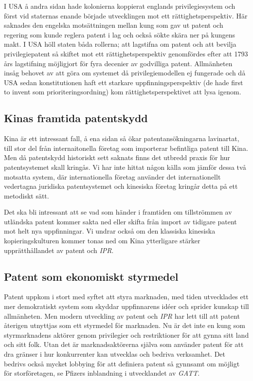 I USA å andra sidan hade kolonierna koppierat englands privilegiesystem och först vid staternas enande började utvecklingen mot ett rättighetsperspektiv. Här saknades den engelska motsättningen mellan kung som gav ut patent och regering som kunde reglera patent i lag och också sökte skära ner på kungens makt. I USA höll staten båda rollerna; att lagstifna om patent och att bevilja privilegiepatent så skiftet mot ett rättighetsperspektiv genomfördes efter att 1793 års lagstifning möjligjort för fyra decenier av godvilliga patent. Allmänheten insåg behovet av att göra om systemet då privilegiemodellen ej fungerade och då USA sedan konstitutionen haft ett starkare uppfinningsperspektiv (de hade first to invent som prioriteringsordning) kom rättighetsperspektivet att lysa igenom.


\subsection{Kinas framtida patentskydd}

Kina är ett intressant fall, å ena sidan så ökar patentansökningarna lavinartat, till stor del från internaitonella företag som importerar befintliga patent till Kina. Men då patentskydd historiskt sett saknats finns det  utbredd praxis för hur patentsystemet skall kringås. Vi har inte hittat någon källa som jämför dessa två motsatta system, där internationella företag använder det internationellt vedertagna juridiska patentsystemet och kinesiska företag kringår detta på ett metodiskt sätt. 

Det ska bli intressant att se vad som händer i framtiden om tillströmmen av utländska patent kommer sakta ned eller skifta från import av tidigare patent mot helt nya uppfinningar. Vi undrar också om den klassiska kinesiska kopieringskulturen kommer tonas ned om Kina ytterligare stärker upprätthållandet av patent och \emph{IPR}.

\subsection{Patent som ekonomiskt styrmedel}
Patent uppkom i stort med syftet att styra marknaden, med tiden utvecklades ett mer demokratiskt system som skyddar uppfinnarens idéer och sprider kunskap till allmänheten. Men modern utveckling  av patent och \emph{IPR} har lett till att patent återigen utnyttjas som ett styrmedel för marknaden. Nu är det inte en kung som styrmarknadens aktörer genom privilegier och restriktioner för att gynna sitt land och sitt folk. Utan det är marknadsaktörerna själva som använder patent för att dra gränser i hur konkurrenter kan utvecklas och bedriva verksamhet. Det bedrivs också mycket lobbying för att definiera patent så gynnsamt om möjligt för storföretagen, se Pfizers inblandning i utvecklandet av \emph{GATT}.

